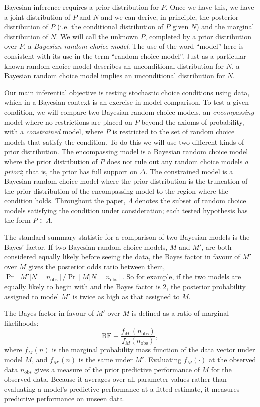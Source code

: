 \documentclass[11pt,letter]{article}
\begin{document}
Bayesian inference requires a prior distribution for $P$.
Once we have this, we have a joint distribution of $P$ and $N$ and we can derive, in principle, the posterior distribution of $P$ (i.e. the conditional distribution of $P$ given $N$) and the marginal distribution of $N$.
We will call the unknown $P$, completed by a prior distribution over $P$, a {\em Bayesian random choice model}.
The use of the word ``model'' here is consistent with its use in the term ``random choice model''.
Just as a particular known random choice model describes an unconditional distribution for $N$, a Bayesian random choice model implies an unconditional distribution for $N$.

Our main inferential objective is testing stochastic choice conditions using data, which in a Bayesian context is an exercise in model comparison.
To test a given condition, we will compare two Bayesian random choice models, an {\em encompassing} model where no restrictions are placed on $P$ beyond the axioms of probability, with a {\em constrained} model, where $P$ is restricted to the set of random choice models that satisfy the condition.
To do this we will use two different kinds of prior distribution.
The encompassing model is a Bayesian random choice model where the prior distribution of $P$ does not rule out any random choice models {\em a priori}; that is, the prior has full support on $\Delta$.
The constrained model is a Bayesian random choice model where the prior distribution is the truncation of the prior distribution of the encompassing model to the region where the condition holds.
Throughout the paper, $\Lambda$ denotes the subset of random choice models satisfying the condition under consideration; each tested hypothesis has the form \(P\in\Lambda\).

The standard summary statistic for a comparison of two Bayesian models is the Bayes' factor.
If two Bayesian random choice models, $M$ and $M'$, are both considered equally likely before seeing the data, the Bayes factor in favour of $M'$ over $M$ gives the posterior odds ratio between them, $\Pr[M'|N=n_{\mathrm{obs}}]/\Pr[M|N=n_{\mathrm{obs}}]$.
So for example, if the two models are equally likely to begin with and the Bayes factor is 2, the posterior probability assigned to model $M'$ is twice as high as that assigned to $M$.

The Bayes factor in favour of $M'$ over $M$ is defined as a ratio of marginal likelihoods:
\[
  \mathrm{BF} \equiv
  \frac{f_{M'}(n_\mathrm{obs})}{f_M(n_\mathrm{obs})},
\]
where $f_M(n)$ is the marginal probability mass function of the data vector under model $M$, and $f_{M'}(n)$ is the same under $M'$.
Evaluating $f_M(\cdot)$ at the observed data $n_\mathrm{obs}$ gives a measure of the prior predictive performance of $M$ for the observed data.
Because it averages over all parameter values rather than evaluating a model's predictive performance at a fitted estimate, it measures predictive performance on unseen data.
\end{document}
